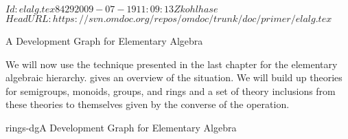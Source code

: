 \svnInfo $Id: elalg.tex 8429 2009-07-19 11:09:13Z kohlhase $
\svnKeyword $HeadURL: https://svn.omdoc.org/repos/omdoc/trunk/doc/primer/elalg.tex $

\begin{omgroup}[id=dg-elal]{A Development Graph for Elementary Algebra}

  We will now use the technique presented in the last chapter for the elementary algebraic
  hierarchy. {} gives an overview of the situation. We will build up
  theories for semigroups, monoids, groups, and rings and a set of theory inclusions from
  these theories to themselves given by the converse of the operation.

\begin{myfig}{rings-dg}{A Development Graph for Elementary Algebra}
\end{myfig}
\end{omgroup}
